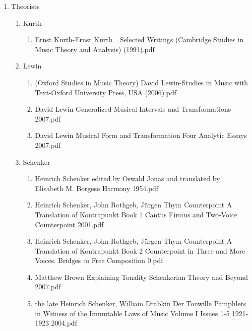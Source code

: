 \documentclass[11pt]{article}
\begin{document}
\begin{enumerate}
\item Theorists
\label{sec-1-1-1-1-31-12-16}
\begin{enumerate}
\item Kurth
\label{sec-1-1-1-1-31-12-16-1}
\begin{enumerate}
\item Ernst Kurth-Ernst Kurth\_ Selected Writings (Cambridge Studies in Music Theory and Analysis) (1991).pdf
\label{sec-1-1-1-1-31-12-16-1-1}
\end{enumerate}

\item Lewin
\label{sec-1-1-1-1-31-12-16-2}
\begin{enumerate}
\item (Oxford Studies in Music Theory) David Lewin-Studies in Music with Text-Oxford University Press, USA (2006).pdf
\label{sec-1-1-1-1-31-12-16-2-1}

\item David Lewin Generalized Musical Intervals and Transformations  2007.pdf
\label{sec-1-1-1-1-31-12-16-2-2}

\item David Lewin Musical Form and Transformation Four Analytic Essays  2007.pdf
\label{sec-1-1-1-1-31-12-16-2-3}
\end{enumerate}

\item Schenker
\label{sec-1-1-1-1-31-12-16-3}
\begin{enumerate}
\item Heinrich Schenker edited by Oswald Jonas and translated by Elisabeth M. Borgese Harmony  1954.pdf
\label{sec-1-1-1-1-31-12-16-3-1}

\item Heinrich Schenker, John Rothgeb, Jürgen Thym Counterpoint A Translation of Kontrapunkt Book 1 Cantus Firmus and Two-Voice Counterpoint  2001.pdf
\label{sec-1-1-1-1-31-12-16-3-2}

\item Heinrich Schenker, John Rothgeb, Jürgen Thym Counterpoint A Translation of Kontrapunkt Book 2 Counterpoint in Three and More Voices. Bridges to Free Composition  0.pdf
\label{sec-1-1-1-1-31-12-16-3-3}

\item Matthew Brown Explaining Tonality Schenkerian Theory and Beyond   2007.pdf
\label{sec-1-1-1-1-31-12-16-3-4}

\item the late Heinrich Schenker, William Drabkin Der Tonwille Pamphlets in Witness of the Immutable Laws of Music Volume I Issues 1-5 1921-1923  2004.pdf
\label{sec-1-1-1-1-31-12-16-3-5}


\end{enumerate}
\end{enumerate}
\end{enumerate}
\end{document}
